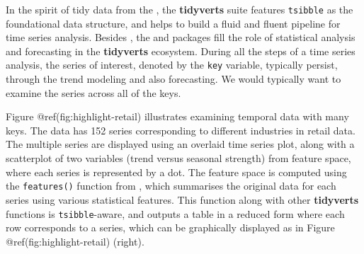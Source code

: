 In the spirit of tidy data from the 
\citep{Wickham2019}, the \textbf{tidyverts} suite features
\texttt{tsibble} as the foundational data structure, and helps to build
a fluid and fluent pipeline for time series analysis. Besides
, the  \citep{R-feasts} and
 \citep{R-fable} packages fill the role of statistical
analysis and forecasting in the \textbf{tidyverts} ecosystem. During all
the steps of a time series analysis, the series of interest, denoted by
the \texttt{key} variable, typically persist, through the trend modeling
and also forecasting. We would typically want to examine the series
across all of the keys.

Figure @ref(fig:highlight-retail) illustrates examining temporal data
with many keys. The data has 152 series corresponding to different
industries in retail data. The multiple series are displayed using an
overlaid time series plot, along with a scatterplot of two variables
(trend versus seasonal strength) from feature space, where each series
is represented by a dot. The feature space is computed using the
\texttt{features()} function from , which summarises the
original data for each series using various statistical features. This
function along with other \textbf{tidyverts} functions is
\texttt{tsibble}-aware, and outputs a table in a reduced form where each
row corresponds to a series, which can be graphically displayed as in
Figure @ref(fig:highlight-retail) (right).

